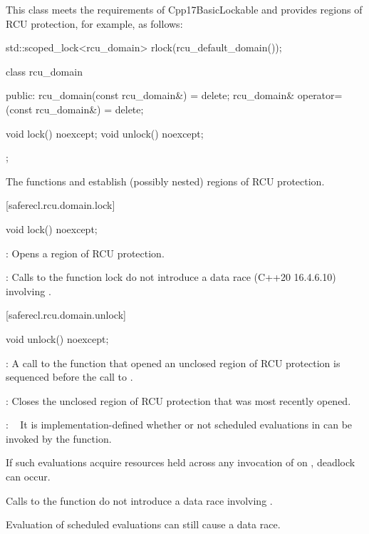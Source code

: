 This class meets the requirements of Cpp17BasicLockable  and provides regions of RCU protection, for example, as follows:

\begin{codeblock}
std::scoped_lock<rcu_domain> rlock(rcu_default_domain());
\end{codeblock}

\begin{codeblock}
class rcu_domain {
public:
  rcu_domain(const rcu_domain&) = delete;
  rcu_domain& operator=(const rcu_domain&) = delete;

  void lock() noexcept;
  void unlock() noexcept;
};
\end{codeblock}

The functions  and  establish (possibly nested)
regions of RCU protection.

[saferecl.rcu.domain.lock]{}

\begin{itemdecl}
void lock() noexcept;
\end{itemdecl}

\begin{itemdescr}

\pnum
{}: Opens a region of RCU protection.

\pnum
{}: Calls to the function lock do not introduce a data race
(C++20 16.4.6.10) involving .

\end{itemdescr}

[saferecl.rcu.domain.unlock]{}

\begin{itemdecl}
void unlock() noexcept;
\end{itemdecl}

\begin{itemdescr}

\pnum
{}: A call to the function  that opened
an unclosed region of RCU protection is sequenced before the
call to .

\pnum
{}: Closes the unclosed region of RCU protection that was
most recently opened.

\pnum
{}:   It is implementation-defined whether or not scheduled
evaluations in  can be invoked by the 
function.
\begin{note}
If such evaluations acquire resources held across any invocation
of  on , deadlock can occur.
\end{note}
Calls to the function  do not introduce a data race
involving .
\begin{note}
Evaluation of scheduled evaluations can still cause a data race.
\end{note}

\end{itemdescr}

